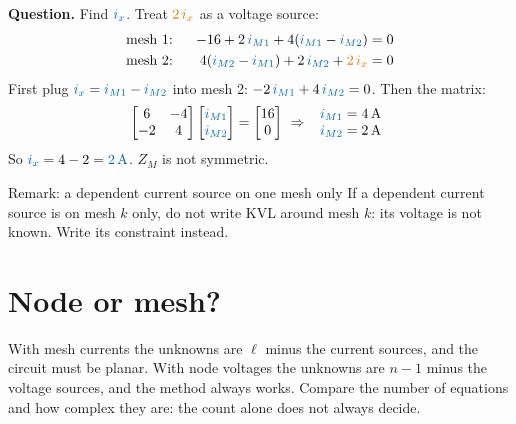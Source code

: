 \documentclass[11pt,a4paper]{article}
\newcommand{\Icol}[1]{\textcolor{ccur}{#1}}
\newcommand{\Vcol}[1]{\textcolor{cvolt}{#1}}
\newcommand{\uni}[1]{\,\mathrm{#1}}
\newcommand{\A}{\uni{A}}   \newcommand{\V}{\uni{V}}
\newcommand{\ohm}{\,\Omega}
\newcommand{\im}[1]{\textcolor{ccur}{i_{M#1}}}
\newcommand{\meshcw}[4][0.36]{%
  \draw[ccur, thick, -{Stealth[length=2mm]}] ($(#2,#3)+(150:#1)$)
    arc[start angle=150, end angle=-150, radius=#1];
  \node[mlabst] at (#2,#3) {#4};}
\newcommand{\exQ}[1]{%
  \draw (0,2.2) to[american voltage source, l_=$\Vcol{16\V}$] (0,0);
  \draw (0,2.2) to[R, l=$2\ohm$] (3.5,2.2) to[R, l=$2\ohm$] (7,2.2);
  \draw (3.5,2.2) to[R, l=$4\ohm$] (3.5,0);
  \draw (7,2.2) to[american controlled voltage source, l=$\Vcol{2\,i_x}$] (7,0);
  \draw (0,0) -- (7,0);
  \foreach \p in {(3.5,2.2),(3.5,0)} \fill \p circle (1.7pt);
  \draw[iar] (3.12,1.45) -- (3.12,0.75); \node[font=\small, text=ccur, anchor=east] at (3.07,1.1) {$i_x$};
  \ifnum#1>0 \meshcw{1.55}{1.1}{1} \meshcw{5.25}{1.1}{2} \fi}
\begin{document}
\begin{examplebox}
\begin{minipage}[c]{0.44\linewidth}
\centering
{}
\end{minipage}\hfill
\begin{minipage}[c]{0.54\linewidth}
\textbf{Question.} Find $\Icol{i_x}$. Treat $\Vcol{2\,i_x}$ as a voltage source:
\begin{alignat*}{2}
  &\text{mesh 1:}\ \ & -16 + 2\,\im{1} + 4(\im{1} - \im{2}) &= 0\\
  &\text{mesh 2:}\ \ & 4(\im{2} - \im{1}) + 2\,\im{2} + \Vcol{2\,i_x} &= 0
\end{alignat*}
First plug $\Icol{i_x} = \im{1} - \im{2}$ into mesh 2: $-2\,\im{1} + 4\,\im{2} = 0$.
Then the matrix:
\[
  \begin{bmatrix} 6 & -4\\ -2 & 4 \end{bmatrix}
  \begin{bmatrix} \im{1}\\ \im{2} \end{bmatrix}
  = \begin{bmatrix} 16\\ 0 \end{bmatrix}
  \ \Rightarrow\ \begin{array}{l} \im{1} = 4\A\\ \im{2} = 2\A \end{array}
\]
So $\Icol{i_x} = 4 - 2 = \Icol{2\A}$. $Z_M$ is not symmetric.
\end{minipage}
\end{examplebox}

\begin{definitionbox}{Remark: a dependent current source on one mesh only}
If a dependent current source is on mesh $k$ only, do not write KVL around mesh $k$: its voltage
is not known. Write its constraint instead.
\end{definitionbox}

\section{Node or mesh?}

With mesh currents the unknowns are $\ell$ minus the current sources, and the circuit must be
planar. With node voltages the unknowns are $n - 1$ minus the voltage sources, and the method
always works. Compare the number of equations and how complex they are: the count alone does
not always decide.
\end{document}
